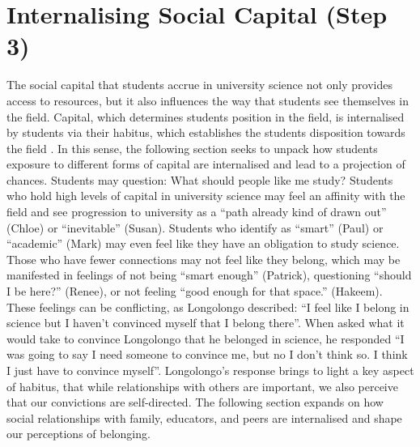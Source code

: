 \section{Internalising Social Capital (Step 3)}
The social capital that students accrue in university science not only provides access to resources, but it also influences the way that students see themselves in the field. Capital, which determines students position in the field, is internalised by students via their habitus, which establishes the students disposition towards the field \cite{Bourdieu1992}. In this sense, the following section seeks to unpack how students exposure to different forms of capital are internalised and lead to a projection of chances. Students may question: What should people like me study? Students who hold high levels of capital in university science may feel an affinity with the field and see progression to university as a ``path already kind of drawn out'' (Chloe) or ``inevitable'' (Susan). Students who identify as ``smart'' (Paul) or ``academic'' (Mark) may even feel like they have an obligation to study science. Those who have fewer connections may not feel like they belong, which may be manifested in feelings of not being ``smart enough'' (Patrick), questioning ``should I be here?'' (Renee), or not feeling ``good enough for that space.'' (Hakeem). These feelings can be conflicting, as Longolongo described: ``I feel like I belong in science but I haven’t convinced myself that I belong there''. When asked what it would take to convince Longolongo that he belonged in science, he responded ``I was going to say I need someone to convince me, but no I don’t think so. I think I just have to convince myself''. Longolongo's response brings to light a key aspect of habitus, that while relationships with others are important, we also perceive that our convictions are self-directed. The following section expands on how social relationships with family, educators, and peers are internalised and shape our perceptions of belonging.
 


